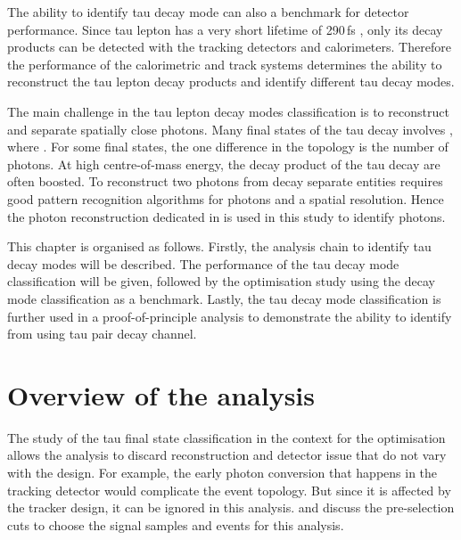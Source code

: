 The ability to identify tau decay mode can also a benchmark for detector performance. Since tau lepton has a very short lifetime of 290\,fs \cite{Abreu:1991jn,Agashe:2014kda}, only its decay products can be detected with the tracking detectors and calorimeters. Therefore the performance of the calorimetric and track systems determines the ability to reconstruct the tau lepton decay products and identify different tau decay modes.


The main challenge in the tau lepton decay modes  classification is to reconstruct and separate spatially close photons. Many final states of the tau decay involves \Ppizero, where \HepProcess{\Ppizero \to \Pphoton \Pphoton}. For some final states, the one difference in the topology is the number of photons. At high centre-of-mass energy, the decay product of the tau decay are often boosted.  To reconstruct two photons from \Ppizero decay  separate entities requires good pattern recognition algorithms for photons and a \ECAL spatial resolution. Hence the photon reconstruction dedicated in  is used in this study to identify photons.

This chapter is organised as follows. Firstly, the analysis chain to identify tau decay modes will be described. The performance of the tau decay mode classification will be given, followed by the \ECAL optimisation study using the decay mode classification as a benchmark. Lastly, the  tau decay mode classification is further used in a proof-of-principle analysis to demonstrate the ability to identify \PHiggs from \PZ using  tau pair decay channel.

%


\section{Overview of the analysis}

The study of the tau final state classification in the context for the  \ECAL optimisation allows the analysis to discard reconstruction and detector issue that do not vary with the \ECAL design. For example, the early photon conversion that happens in the tracking detector would complicate the event topology. But since it is affected by the tracker design, it can be ignored in this analysis.   and  discuss the pre-selection cuts to choose the signal samples and events for this analysis.

